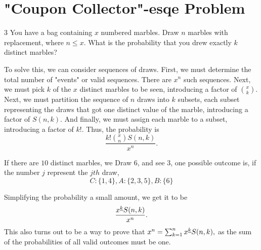 \section{"Coupon Collector"-esqe Problem}
\begin{problem}
	3 You have a bag containing $x$ numbered marbles. Draw $n$ marbles with replacement, where $n\leq x$. What is the probability that you drew exactly $k$ distinct marbles?
\end{problem}
\begin{solution}
To solve this, we can consider sequences of draws. First, we must determine the total number of "events" or valid sequences. There are $x^n$ such sequences. Next, we must pick $k$ of the $x$ distinct marbles to be seen, introducing a factor of ${x\choose k}.$ Next, we must partition the sequence of $n$ draws into $k$ subsets, each subset representing the draws that got one distinct value of the marble, introducing a factor of $S(n,k)$. And finally, we must assign each marble to a subset, introducing a factor of $k!.$ Thus, the probability is \[\frac{k!{x \choose n}S(n,k)}{x^n}.\]
\begin{example}
		If there are $10$ distinct marbles, we Draw $6$, and see $3$, one possible outcome is, if the number $j$ represent the $jth$ draw, \[C:\{1,4\},A:\{2,3,5\},B:\{6\}\]
		
\end{example}
Simplifying the probability a small amount, we get it to be \[\frac{x^{\underline{k}}S(n,k)}{x^n}.\]
This also turns out to be a way to prove that $x^n=\sum_{k=1}^{n}x^{\underline{k}}S(n,k),$ as the sum of the probabilities of all valid outcomes must be one.
\end{solution}
% 
